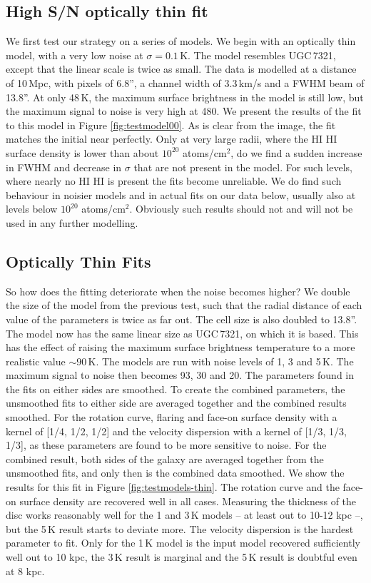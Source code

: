 \documentclass[useAMS,usenatbib]{mn2e}
\newcommand{\hi}{%
  \relax
  \ifmmode
    \textrm{\textsc{HI}}
  \else
    \textsc{H{\smaller}I}
  \fi
}
\begin{document}
\subsection{High S/N optically thin fit}
We first test our strategy on a series of models.
We begin with an optically thin model, with a very low noise at 
$\sigma=0.1$\,K. The model resembles UGC\,7321, except that the 
linear scale is twice as small.
The data is modelled at a distance of 10\,Mpc, with pixels of 
6.8'', a channel width of 3.3\,km/s and a FWHM beam of 13.8''.
At only 48\,K, the maximum surface brightness in the model is 
still low, but the maximum signal to noise is very high at 480.
We present the results of the fit to this model in Figure 
\ref{fig:testmodel00}. 
As is clear from the image, the fit matches the initial near 
perfectly. Only at very large radii, where the \hi surface density is 
lower than about  $10^{20}$ atoms/cm$^{2}$, do we find a sudden increase in FWHM
and decrease in $\sigma$ that are not present in the model. For such levels,
where nearly no \hi is present the fits become unreliable. 
We do find such behaviour in noisier models and in actual fits on our data 
below, usually also at levels below $10^{20}$ atoms/cm$^{2}$. Obviously 
such results should not and will not be used in any further modelling.


\subsection{Optically Thin Fits}
So how does the fitting deteriorate when the noise becomes higher?
We double the size of the model from the previous test, such that the 
radial distance of each value of the parameters is twice as far out. 
The cell size is also doubled to 13.8''. The model now has the same 
linear size as UGC\,7321, on which it is based.
This has the effect of raising the maximum surface brightness 
temperature to a more realistic value $\sim90$\,K.
The models are run with noise levels of 1, 3 and 5\,K.
The maximum signal to noise then becomes 93, 30 and 20. 
The parameters found in the fits on either sides are smoothed.
To create the combined parameters, the unsmoothed fits to either side are 
averaged together and the combined results smoothed.
For the rotation curve, flaring and face-on surface density with a 
kernel of [1/4, 1/2, 1/2] and the velocity dispersion with a kernel of 
[1/3, 1/3, 1/3], as these parameters are found to be more sensitive to noise.
For the combined result, both sides of the galaxy are averaged together 
from the unsmoothed fits, and only then is the combined data smoothed.
We show the results for this fit in Figure \ref{fig:testmodels-thin}.
The rotation curve and the face-on surface density are recovered well 
in all cases.
Measuring the thickness of the disc works reasonably well for the 1 
and 3\,K models -- at least out to 10-12 kpc --, 
but the 5\,K result starts to deviate more.
The velocity dispersion is the hardest parameter to fit. 
Only for the 1\,K model is the input model recovered sufficiently 
well out to 10 kpc, the 3\,K result is marginal and the 5\,K result is 
doubtful even at 8 kpc.
\end{document}
